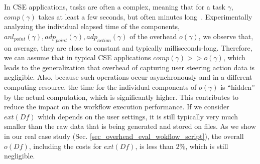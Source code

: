 In CSE applications, tasks are often a complex, meaning that for a task $\gamma$, $comp(\gamma)$ takes at least a few
seconds, but often minutes long~\cite{Raicu2008Many-task}.
Experimentally analyzing the individual elapsed time of the components,
$anl_{point}(\gamma), adp_{point}(\gamma), adp_{action}(\gamma)$
of the overhead $o(\gamma)$,
we observe that, on average, they are close to
constant and typically milliseconds-long.
Therefore, we can assume that
in typical CSE applications $comp(\gamma) >> o(\gamma)$, which leads to the generalization that overhead of capturing user steering action data is negligible.
Also,
because such operations occur asynchronously and in a different
computing resource, the time for the individual components of
$o(\gamma)$ is ``hidden'' by the actual computation, which
is significantly higher. This contributes to reduce the impact on the
workflow execution performance.
If we consider $ext(Df)$  which depends on
the user settings, it is still typically very much smaller than the raw
data that is being generated and stored on files. As we show in our real
case study (Sec. \ref{sec_overhead_eval_wokflow_script}), the overall $o(Df)$, including the
costs for $ext(Df)$, is less than 2\%, which is still negligible.


